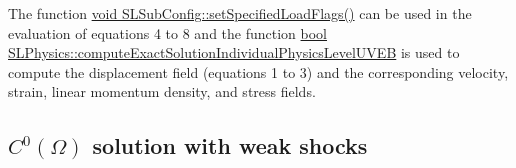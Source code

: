 \documentclass[12pt]{article}
\begin{document}
The function \underline{void SLSubConfig::setSpecifiedLoadFlags()} can be used in the evaluation of equations 4 to 8 and the function 
 \underline{bool SLPhysics::computeExactSolutionIndividualPhysicsLevelUVEB} is used to compute the displacement field (equations 1 to 3) and the corresponding velocity, strain, linear momentum density, and stress fields.

\subsection{$C^0(\Omega)$ solution with weak shocks}

% 
%
\end{document}
